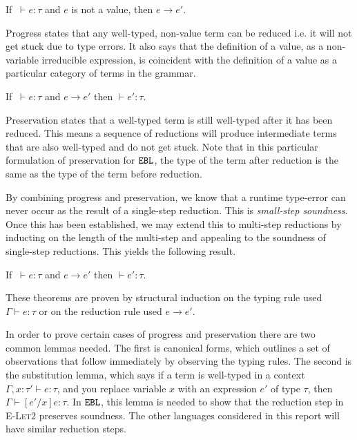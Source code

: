 \begin{theorem}[Progress]
If $~\vdash e: \tau$ and $e$ is not a value, then $e \longrightarrow e'$.
\end{theorem}

Progress states that any well-typed, non-value term can be reduced i.e. it will not get stuck due to type errors. It also says that the definition of a value, as a non-variable irreducible expression, is coincident with the definition of a value as a particular category of terms in the grammar.

\begin{theorem}[Preservation]
If $~\vdash e: \tau$ and $e \longrightarrow e'$ then $\vdash e': \tau$.
\end{theorem}

Preservation states that a well-typed term is still well-typed after it has been reduced. This means a sequence of reductions will produce intermediate terms that are also well-typed and do not get stuck. Note that in this particular formulation of preservation for $\mathtt{EBL}$, the type of the term after reduction is the same as the type of the term before reduction.

By combining progress and preservation, we know that a runtime type-error can never occur as the result of a single-step reduction. This is \textit{small-step soundness}. Once this has been established, we may extend this to multi-step reductions by inducting on the length of the multi-step and appealing to the soundness of single-step reductions. This yields the following result.

\begin{theorem}[Soundness]
If $~\vdash e: \tau$ and $e \longrightarrow e'$ then $\vdash e': \tau$.
\end{theorem}

These theorems are proven by structural induction on the typing rule used $\Gamma \vdash e: \tau$ or on the reduction rule used $e \rightarrow e'$. 

In order to prove certain cases of progress and preservation there are two common lemmas needed. The first is canonical forms, which outlines a set of observations that follow immediately by observing the typing rules. The second is the substitution lemma, which says if a term is well-typed in a context $\Gamma, x: \tau' \vdash e: \tau$, and you replace variable $x$ with an expression $e'$ of type $\tau$, then $\Gamma \vdash [e'/x]e: \tau$. In $\mathtt{EBL}$, this lemma is needed to show that the reduction step in \textsc{E-Let2} preserves soundness. The other languages considered in this report will have similar reduction steps.


